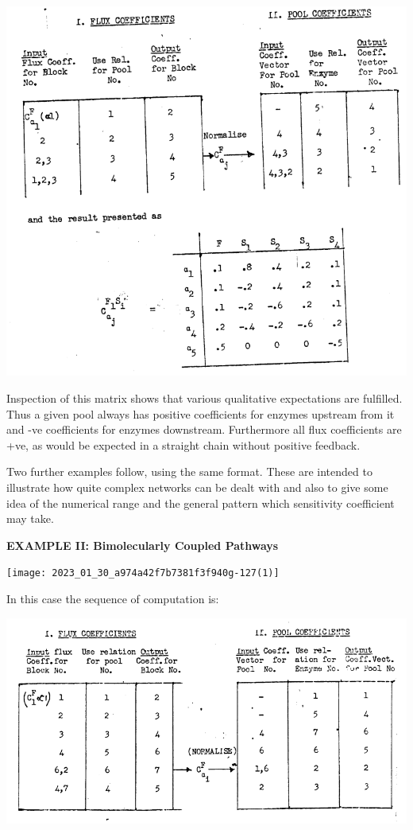 \begin{center}
\includegraphics[max width=\textwidth]{figure3_ExampI.PNG}
\end{center}

Inspection of this matrix shows that various qualitative expectations are fulfilled. Thus a given pool always has positive coefficients for enzymes upstream from it and -ve coefficients for enzymes downstream. Furthermore all flux coefficients are +ve, as would be expected in a straight chain without positive feedback.

Two further examples follow, using the same format. These are intended to illustrate how quite complex networks can be dealt with and also to give some idea of the numerical range and the general pattern which sensitivity coefficient may take.

{\bf\large EXAMPLE II: Bimolecularly Coupled Pathways}

\begin{center}
\texttt{[image: 2023\_01\_30\_a974a42f7b7381f3f940g-127(1)]}
\end{center}

In this case the sequence of computation is:

\includegraphics[max width=1.1\textwidth]{figure3_ExampII}

